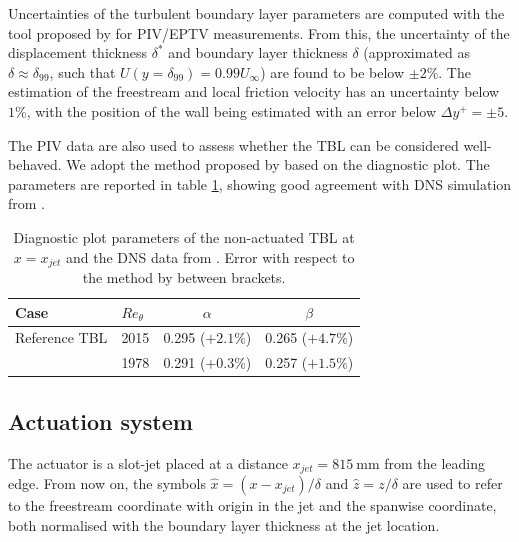 Uncertainties of the turbulent boundary layer parameters are computed with the tool proposed by \citet{Castellanos2021PIVuncertainty} for PIV/EPTV measurements. From this, the uncertainty of the displacement thickness $\delta^*$ and boundary layer thickness $\delta$ (approximated as $\delta \approx \delta_{99}$, such that $U(y=\delta_{99})=0.99U_\infty$) are found to be below $\pm 2\%$. The estimation of the freestream and local friction velocity has an uncertainty below $1\%$, with the position of the wall being estimated with an error below $\Delta y^+ = \pm 5$. 

The PIV data are also used to assess whether the TBL can be considered well-behaved. We adopt the method proposed by \citet{sanmiguel2017diagnostic} based on the diagnostic plot. The parameters are reported in table \ref{tab:diagnostic}, showing good agreement with DNS simulation from \cite{jimenez2010}.

\begin{table}
\centering
\begin{tabular}{llcc}
\toprule
Case & $Re_\theta$ & $\alpha$ & $\beta$ \\ \midrule
Reference TBL & 2015 & 0.295 ($+2.1\%$) & 0.265 ($+4.7\%$) \\
\citet{jimenez2010} & 1978 & 0.291 ($+0.3\%$) & 0.257 ($+1.5\%$) \\
\bottomrule
\end{tabular}
\caption{Diagnostic plot parameters of the non-actuated TBL at $x=x_{jet}$ and the DNS data from \citet{jimenez2010}. Error with respect to the method by \citet{sanmiguel2017diagnostic} between brackets.}\label{tab:diagnostic}
\end{table}

\subsection{Actuation system \label{ss:actuator}}
%
The actuator is a slot-jet placed at a distance $x_{jet} = 815~\mathrm{mm}$ from the leading edge. From now on, the symbols $\hat{x}=(x-x_{jet})/\delta$ and $\hat{z}=z/\delta$ are used to refer to the freestream coordinate with origin in the jet and the spanwise coordinate, both normalised with the boundary layer thickness at the jet location.

